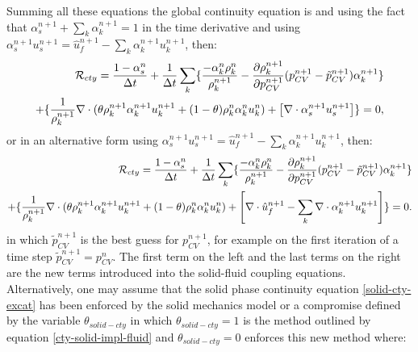 Summing all these equations the global continuity equation is and using the fact that $ \alpha_s^{n+1}+\sum_k\alpha_k^{n+1}=1$ in the time 
derivative and using $\alpha_s^{n+1} u_s^{n+1}=\hat u_f^{n+1} - \sum_k\alpha_k^{n+1} u_k^{n+1}$, then: 
\begin{eqnarray}
{\cal{R}}_{cty} =\frac{1-\alpha_s^n}{\Delta t} + 
\frac{1}{\Delta t} \sum_k\{ 
\frac{  - \alpha_k^n\rho_k^{n}} {\rho_k^{n+1}} 
-  \frac{\partial \rho_k^{n+1}}{\partial p_{CV}^{n+1}} (p_{CV}^{n+1}-\tilde{p}_{CV}^{n+1}) \alpha_k^{n+1} \}
\\
+ 
\{ 
\frac{1}{\rho_k^{n+1} } \nabla\cdot (\theta \rho_k^{n+1} \alpha_k^{n+1} u_k^{n+1}+(1-\theta) \rho_k^{n} \alpha_k^{n} u_k^{n}) 
+\left[ \nabla\cdot\alpha_s^{n+1} u_s^{n+1} \right] \} 
=0, 
\end{eqnarray} 
or in an alternative form using $\alpha_s^{n+1} u_s^{n+1}=\hat u_f^{n+1} - \sum_k\alpha_k^{n+1} u_k^{n+1}$, then:
\begin{eqnarray}
{\cal{R}}_{cty} =\frac{1-\alpha_s^n}{\Delta t} + 
\frac{1}{\Delta t} \sum_k\{ 
\frac{  - \alpha_k^n\rho_k^{n}} {\rho_k^{n+1}} 
-  \frac{\partial \rho_k^{n+1}}{\partial p_{CV}^{n+1}} (p_{CV}^{n+1}-\tilde{p}_{CV}^{n+1}) \alpha_k^{n+1} \}
\\
+ 
\{ 
\frac{1}{\rho_k^{n+1} } \nabla\cdot (\theta \rho_k^{n+1} \alpha_k^{n+1} u_k^{n+1}+(1-\theta) \rho_k^{n} \alpha_k^{n} u_k^{n}) 
+\left[ \nabla\cdot\hat u_f^{n+1} - \sum_k \nabla\cdot \alpha_k^{n+1} u_k^{n+1} \right] \} 
=0. 
\label{cty-solid-impl-fluid} 
\end{eqnarray} 
in which $\tilde{p}_{CV}^{n+1}$ is the best guess for ${p}_{CV}^{n+1}$, for example on the first iteration of a 
time step  $\tilde{p}_{CV}^{n+1} ={p}_{CV}^{n}$. 
The first term on the left and the last terms on the right are the new terms introduced into the solid-fluid coupling equations. 
Alternatively, one may assume that the solid phase continuity equation \ref{solid-cty-excat}  has been enforced 
by the solid mechanics model or a compromise defined by the variable $\theta_{solid-cty}$ in which 
$\theta_{solid-cty}=1$ is the method outlined by equation \ref{cty-solid-impl-fluid} and $\theta_{solid-cty}=0$ 
enforces this new method where:

